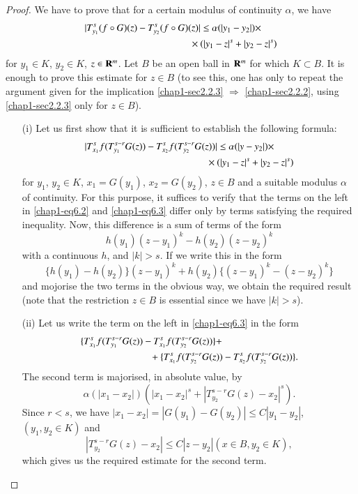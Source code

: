 \begin{proof}
We have to prove that for a certain modulus of continuity $\alpha$, we have
\setcounter{equation}{1}
\begin{align}
& |T^{s}_{y_{1}}(f\circ G)(z)-T^{s}_{y_{2}}(f\circ G)(z)|\leq \alpha (|y_{1}-y_{2}|)\times\notag\\
&\hspace{3.8cm} \times (|y_{1}-z|^{s}+|y_{2}-z|^{s})\label{chap1-eq6.2}
\end{align}
for $y_{1}\in K$, $y_{2}\in K$, $z\in \mathbf{R}^{m}$. Let $B$ be an open ball in $\mathbf{R}^{m}$ for which $K\subset B$. It is enough to prove this estimate for $z\in B$ (to see this, one has only to repeat the argument given for the implication \eqref{chap1-sec2.2.3} $\Rightarrow$ \eqref{chap1-sec2.2.2}, using \eqref{chap1-sec2.2.3} only for $z\in B$).
\begin{itemize}
\item[(i)] Let us first show that it is sufficient to establish the following formula:
\begin{align}
& |T^{s}_{x_{1}}f(T^{s-r}_{y_{1}}G(z))-T^{s}_{x_{2}}f(T^{s-r}_{y_{2}}G(z))|\leq \alpha(|y-y_{2}|)\times\notag\\
&\hspace{4.4cm} \times (|y_{1}-z|^{s}+|y_{2}-z|^{s})\label{chap1-eq6.3}
\end{align}
for $y_{1}$, $y_{2}\in K$, $x_{1}=G(y_{1})$, $x_{2}=G(y_{2})$, $z\in B$ and a suitable modulus $\alpha$ of continuity. For this purpose, it suffices to verify that the terms on the left in \eqref{chap1-eq6.2} and \eqref{chap1-eq6.3} differ only by terms satisfying the required inequality. Now, this difference is a sum of terms of the form
$$
h(y_{1})(z-y_{1})^{k}-h(y_{2})(z-y_{2})^{k}
$$
with a continuous $h$, and $|k|>s$. If we write this in the form
$$
\{h(y_{1})-h(y_{2})\}(z-y_{1})^{k}+h(y_{2})\{(z-y_{1})^{k}-(z-y_{2})^{k}\}
$$
and mojorise the two terms in the obvious way, we obtain the required result (note that the restriction $z\in B$ is essential since we have $|k|>s$).

\item[(ii)] Let us write the term on the left in \eqref{chap1-eq6.3} in the form
\begin{align}
& \{T^{s}_{x_{1}}f(T^{s-r}_{y_{1}}G(z))-T^{s}_{x_{1}}f(T^{s-r}_{y_{2}}G(z))\}+\notag\\
& \hspace{2.5cm} +\{T^{s}_{x_{1}}f(T^{s-r}_{y_{2}}G(z))-T^{s}_{x_{2}}f(T^{s-r}_{y_{2}}G(z))\}.\label{chap1-eq6.4}
\end{align}
The second term is majorised, in absolute value, by
$$
\alpha (|x_{1}-x_{2}|)(|x_{1}-x_{2}|^{s}+|T^{s-r}_{y_{2}}G(z)-x_{2}|^{s}).
$$
Since $r<s$, we have $|x_{1}-x_{2}|=|G(y_{1})-G(y_{2})|\leq C|y_{1}-y_{2}|$, $(y_{1},y_{2}\in K)$ and 
\begin{equation}
|T^{s-r}_{y_{2}}G(z)-x_{2}|\leq C|z-y_{2}|(x\in B, y_{2}\in K),\label{chap1-eq6.5}
\end{equation}
which gives us the required estimate for the second term.


\end{itemize}
\end{proof}
